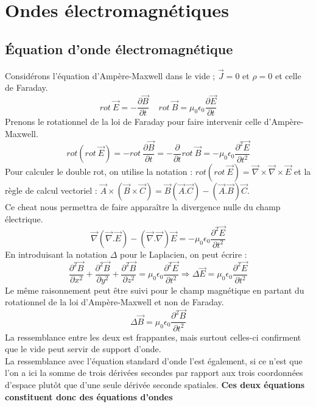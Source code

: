 \documentclass	[11pt, a4paper, openany]{book}
\begin{document}
\section{Ondes électromagnétiques}
\subsection{Équation d'onde électromagnétique}
Considérons l'équation d'Ampère-Maxwell dans le vide ; $\vec{J} = 0$ et $\rho = 0$ et celle de Faraday.
\begin{equation}
rot\ \vec{E} = -\frac{\partial\vec{B}}{\partial t}\ \ \ \ \ rot\ \vec{B} = \mu_0\epsilon_0\frac{\partial\vec{E}}{\partial t}
\end{equation}
Prenons le rotationnel de la loi de Faraday pour faire intervenir celle d'Ampère-Maxwell.
\begin{equation}
rot(rot\ \vec{E}) = -rot\ \frac{\partial \vec{B}}{\partial t} = -\frac{\partial}{\partial t} rot\ \vec{B} = -\mu_0\epsilon_0\frac{\partial^2\vec{E}}{\partial t^2}
\end{equation}
Pour calculer le double rot, on utilise la notation : $rot(rot\ \vec{E}) = \vec{\nabla}\times\vec{\nabla}\times
\vec{E}$ et la règle de calcul vectoriel : $\vec{A}\times(\vec{B}\times\vec{C}) = \vec{B}(\vec{A}.\vec{C}) - (\vec{A}.\vec{B})\vec{C}$.\\
Ce cheat nous permettra de faire apparaître la divergence nulle du champ électrique.
\begin{equation}
\vec{\nabla}(\vec{\nabla}.\vec{E}) - (\vec{\nabla}.\vec{\nabla})\vec{E} = -\mu_0\epsilon_0\frac{\partial^2\vec{E}}{\partial t^2}
\end{equation}
En introduisant la notation $\Delta$ pour le Laplacien, on peut écrire : 
\begin{equation}
\frac{\partial^2\vec{B}}{\partial x^2} + \frac{\partial^2\vec{B}}{\partial y^2} + \frac{\partial^2\vec{B}}{\partial z^2} = \mu_0\epsilon_0\frac{\partial^2\vec{E}}{\partial t^2} \Rightarrow \Delta\vec{E} = \mu_0\epsilon_0\frac{\partial^2\vec{E}}{\partial t^2}
\end{equation}
Le même raisonnement peut être suivi pour le champ magnétique en partant du rotationnel de la loi d'Ampère-Maxwell et non de Faraday.
\begin{equation}
\Delta\vec{B} = \mu_0\epsilon_0\frac{\partial^2\vec{B}}{\partial t^2}
\end{equation}
La ressemblance entre les deux est frappantes, mais surtout celles-ci confirment que le vide peut servir de support d'onde.\\
La ressemblance avec l'équation standard d'onde l'est également, si ce n'est que l'on a ici la somme de trois dérivées secondes par rapport aux trois coordonnées d'espace plutôt que d'une seule dérivée seconde spatiales. \textbf{Ces deux équations constituent donc des équations d'ondes}
\end{document}
